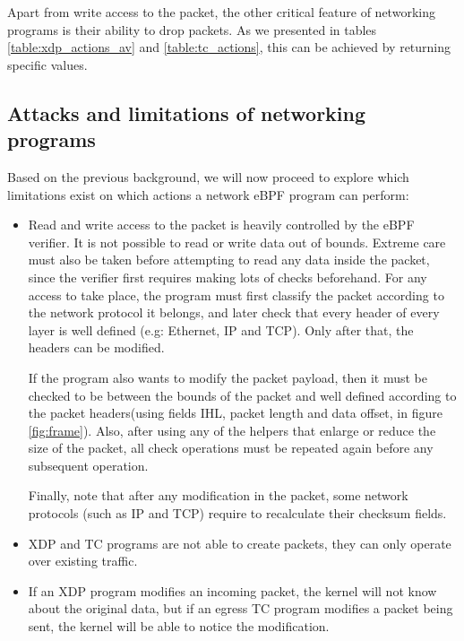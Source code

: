 Apart from write access to the packet, the other critical feature of networking programs is their ability to drop packets. As we presented in tables \ref{table:xdp_actions_av} and \ref{table:tc_actions}, this can be achieved by returning specific values.


\subsection{Attacks and limitations of networking programs}
Based on the previous background, we will now proceed to explore which limitations exist on which actions a network eBPF program can perform:
\begin{itemize}
\item Read and write access to the packet is heavily controlled by the eBPF verifier. It is not possible to read or write data out of bounds. Extreme care must also be taken before attempting to read any data inside the packet, since the verifier first requires making lots of checks beforehand. For any access to take place, the program must first classify the packet according to the network protocol it belongs, and later check that every header of every layer is well defined (e.g: Ethernet, IP and TCP). Only after that, the headers can be modified. 

If the program also wants to modify the packet payload, then it must be checked to be between the bounds of the packet and well defined according to the packet headers(using fields IHL, packet length and data offset, in figure \ref{fig:frame}). Also, after using any of the helpers that enlarge or reduce the size of the packet, all check operations must be repeated again before any subsequent operation.

Finally, note that after any modification in the packet, some network protocols (such as IP and TCP) require to recalculate their checksum fields. 

\item XDP and TC programs are not able to create packets, they can only operate over existing traffic.

\item If an XDP program modifies an incoming packet, the kernel will not know about the original data, but if an egress TC program modifies a packet being sent, the kernel will be able to notice the modification.
\end{itemize}


